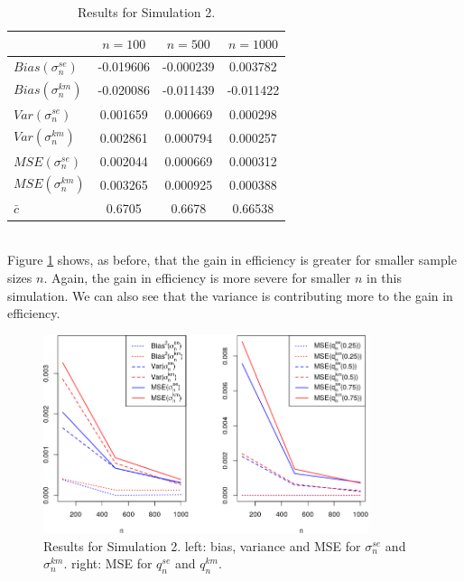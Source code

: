 \begin{table}[h!]
	\begin{center}
		\begin{tabular}{| l || c | c | c |}
			\hline
			&       $n=100$   &    $n=500$    &    $n=1000$\\
			\hline
			\hline
			$Bias(\sigma_n^{se})$ & -0.019606 & -0.000239 & 0.003782\\
			$Bias(\sigma_n^{km})$ & -0.020086 & -0.011439 & -0.011422\\
			\hline
			$Var(\sigma_n^{se})$ & 0.001659 & 0.000669 & 0.000298\\
			$Var(\sigma_n^{km})$ & 0.002861 & 0.000794 & 0.000257\\
			\hline
			$MSE(\sigma_n^{se})$ & 0.002044 & 0.000669 & 0.000312\\
			$MSE(\sigma_n^{km})$ & 0.003265 & 0.000925 & 0.000388\\
			\hline
			\hline
			$\bar c$ & 0.6705 & 0.6678 & 0.66538\\
			\hline
		\end{tabular}
	\end{center}
	\caption{Results for Simulation 2.}
	\label{tab:res_weiwei1}
\end{table}\\
%
Figure \ref{fig:mse_weiwei} shows, as before, that the gain in efficiency is greater for smaller sample sizes $n$. Again, the gain in efficiency is more severe for smaller $n$ in this simulation. We can also see that the variance is contributing more to the gain in efficiency.
%
\clearpage
%
\begin{figure}[h]
	\begin{center}
		\includegraphics[width=0.85\textwidth]{./figures/weiwei_mse2}
	\end{center}
	\caption{Results for Simulation 2. left: bias, variance and MSE for $\sigma_n^{se}$ and $\sigma_n^{km}$. right: MSE for $q_n^{se}$ and $q_n^{km}$.}
	\label{fig:mse_weiwei}
\end{figure}
